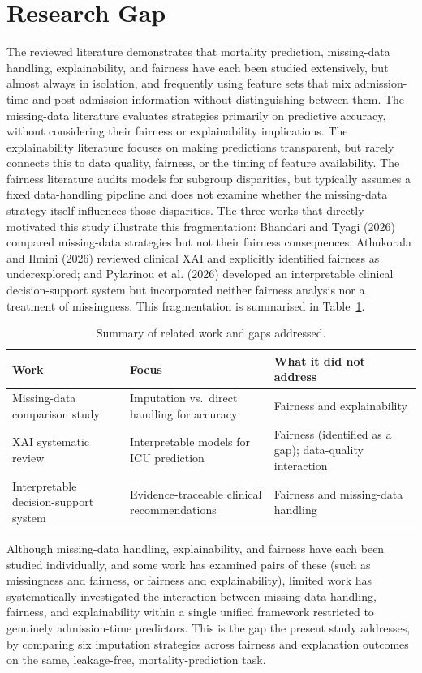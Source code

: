 \documentclass[12pt,a4paper]{report}
\begin{document}
\section{Research Gap}
The reviewed literature demonstrates that mortality prediction, missing-data handling, explainability, and fairness have each been studied extensively, but almost always in isolation, and frequently using feature sets that mix admission-time and post-admission information without distinguishing between them. The missing-data literature evaluates strategies primarily on predictive accuracy, without considering their fairness or explainability implications. The explainability literature focuses on making predictions transparent, but rarely connects this to data quality, fairness, or the timing of feature availability. The fairness literature audits models for subgroup disparities, but typically assumes a fixed data-handling pipeline and does not examine whether the missing-data strategy itself influences those disparities. The three works that directly motivated this study illustrate this fragmentation: Bhandari and Tyagi (2026) compared missing-data strategies but not their fairness consequences; Athukorala and Ilmini (2026) reviewed clinical XAI and explicitly identified fairness as underexplored; and Pylarinou et al. (2026) developed an interpretable clinical decision-support system but incorporated neither fairness analysis nor a treatment of missingness. This fragmentation is summarised in Table~\ref{tab:gap-summary}.


\begin{table}[H]
\centering
\caption{Summary of related work and gaps addressed.}
\label{tab:gap-summary}
\small
\begin{tabular}{p{3.5cm}p{4.5cm}p{4.5cm}}
\toprule
Work & Focus & What it did not address \\
\midrule
Missing-data comparison study & Imputation vs.\ direct handling for accuracy & Fairness and explainability \\
XAI systematic review & Interpretable models for ICU prediction & Fairness (identified as a gap); data-quality interaction \\
Interpretable decision-support system & Evidence-traceable clinical recommendations & Fairness and missing-data handling \\
\bottomrule
\end{tabular}
\end{table}


Although missing-data handling, explainability, and fairness have each been studied individually, and some work has examined pairs of these (such as missingness and fairness, or fairness and explainability), limited work has systematically investigated the interaction between missing-data handling, fairness, and explainability within a single unified framework restricted to genuinely admission-time predictors. This is the gap the present study addresses, by comparing six imputation strategies across fairness and explanation outcomes on the same, leakage-free, mortality-prediction task.
\end{document}
